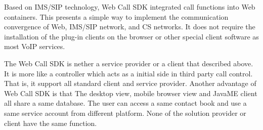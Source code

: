 Based on IMS/SIP technology, Web Call SDK integrated call functions into Web containers. This presents a simple way to implement the communication convergence of Web, IMS/SIP network, and CS networks. It does not require the installation of the plug-in clients on the browser or other special client software as most VoIP services.

The Web Call SDK is nether a service provider or a client that described above. It is more like a controller which acts as a initial side in third party call control. That is, it support all standard client and service provider. Another advantage of Web Call SDK is that The desktop view, mobile browser view and JavaME client all share a same database. The user can access a same contact book and use a same service account from different platform. None of the solution provider or client have the same function.

